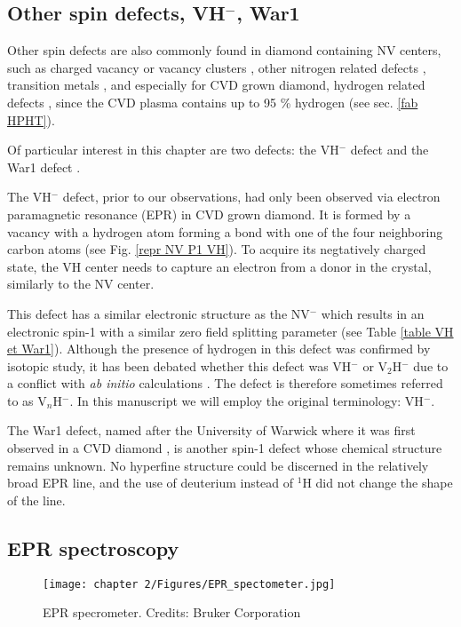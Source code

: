 \documentclass[a4paper, 11pt]{book}
\begin{document}
\subsection{Other spin defects, VH$^-$, War1}
\label{other defects}
Other spin defects are also commonly found in diamond containing NV centers, such as charged vacancy or vacancy clusters \citep{hounsome2006origin}, other nitrogen related defects \citep{newton2007epr}, transition metals \citep{isoya1990fourier}, and especially for CVD grown diamond, hydrogen related defects \citep{hartland2014study}, since the CVD plasma contains up to 95 \% hydrogen (see sec. \ref{fab HPHT}).

Of particular interest in this chapter are two defects: the VH$^-$ defect \citep{glover2003hydrogen, glover2004hydrogen} and the War1 defect \citep{cruddace2007magnetic}. 

The VH$^-$ defect, prior to our observations, had only been observed via electron paramagnetic resonance (EPR) in CVD grown diamond. It is formed by a vacancy with a hydrogen atom forming a bond with one of the four neighboring carbon atoms (see Fig. \ref{repr NV P1 VH}). To acquire its negtatively charged state, the VH center needs to capture an electron from a donor in the crystal, similarly to the NV center. 

This defect has a similar electronic structure as the NV$^-$ which results in an electronic spin-1 with a similar zero field splitting parameter (see Table \ref{table VH et War1}). Although the presence of hydrogen in this defect was confirmed by isotopic study, it has been debated whether this defect was VH$^-$ or V$_2$H$^-$ due to a conflict with \textit{ab initio} calculations \citep{shaw2005importance}. The defect is therefore sometimes referred to as V$_n$H$^-$. In this manuscript we will employ the original terminology: VH$^-$.

The War1 defect, named after the University of Warwick where it was first observed in a CVD diamond \citep{cruddace2007magnetic}, is another spin-1 defect whose chemical structure remains unknown. No hyperfine structure could be discerned in the relatively broad EPR line, and the use of deuterium instead of $^1$H did not change the shape of the line.

\subsection{EPR spectroscopy}
\begin{figure}[h!]
\centering
\texttt{[image: chapter 2/Figures/EPR\_spectometer.jpg]}
\caption{EPR specrometer. Credits: Bruker Corporation} 
\label{photo EPR}
\end{figure}
\end{document}
